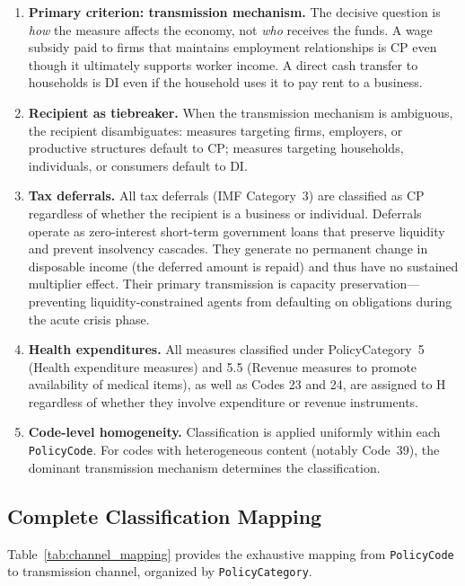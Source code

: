 \documentclass[12pt]{article}
\begin{document}
\begin{enumerate}
  \item \textbf{Primary criterion: transmission mechanism.} The decisive question is \emph{how} the measure affects the economy, not \emph{who} receives the funds. A wage subsidy paid to firms that maintains employment relationships is CP even though it ultimately supports worker income. A direct cash transfer to households is DI even if the household uses it to pay rent to a business.
  \item \textbf{Recipient as tiebreaker.} When the transmission mechanism is ambiguous, the recipient disambiguates: measures targeting firms, employers, or productive structures default to CP; measures targeting households, individuals, or consumers default to DI.
  \item \textbf{Tax deferrals.} All tax deferrals (IMF Category~3) are classified as CP regardless of whether the recipient is a business or individual. Deferrals operate as zero-interest short-term government loans that preserve liquidity and prevent insolvency cascades. They generate no permanent change in disposable income (the deferred amount is repaid) and thus have no sustained multiplier effect. Their primary transmission is capacity preservation---preventing liquidity-constrained agents from defaulting on obligations during the acute crisis phase.
  \item \textbf{Health expenditures.} All measures classified under PolicyCategory~5 (Health expenditure measures) and 5.5 (Revenue measures to promote availability of medical items), as well as Codes 23 and 24, are assigned to H regardless of whether they involve expenditure or revenue instruments.
  \item \textbf{Code-level homogeneity.} Classification is applied uniformly within each \texttt{PolicyCode}. For codes with heterogeneous content (notably Code~39), the dominant transmission mechanism determines the classification.
\end{enumerate}

\subsection{Complete Classification Mapping}

Table~\ref{tab:channel_mapping} provides the exhaustive mapping from \texttt{PolicyCode} to transmission channel, organized by \texttt{PolicyCategory}.
\end{document}

